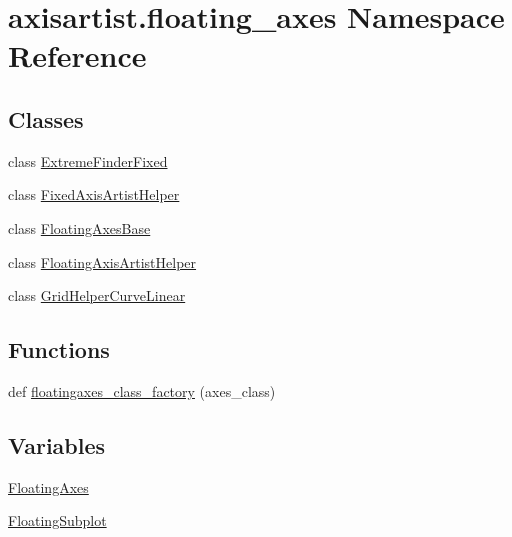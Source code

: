 \hypertarget{namespaceaxisartist_1_1floating__axes}{}\section{axisartist.\+floating\+\_\+axes Namespace Reference}
\label{namespaceaxisartist_1_1floating__axes}
\subsection*{Classes}
\begin{DoxyCompactItemize}
\item 
class \hyperlink{classaxisartist_1_1floating__axes_1_1ExtremeFinderFixed}{Extreme\+Finder\+Fixed}
\item 
class \hyperlink{classaxisartist_1_1floating__axes_1_1FixedAxisArtistHelper}{Fixed\+Axis\+Artist\+Helper}
\item 
class \hyperlink{classaxisartist_1_1floating__axes_1_1FloatingAxesBase}{Floating\+Axes\+Base}
\item 
class \hyperlink{classaxisartist_1_1floating__axes_1_1FloatingAxisArtistHelper}{Floating\+Axis\+Artist\+Helper}
\item 
class \hyperlink{classaxisartist_1_1floating__axes_1_1GridHelperCurveLinear}{Grid\+Helper\+Curve\+Linear}
\end{DoxyCompactItemize}
\subsection*{Functions}
\begin{DoxyCompactItemize}
\item 
def \hyperlink{namespaceaxisartist_1_1floating__axes_a8a8e74a121b233e5cfdec9364d070a54}{floatingaxes\+\_\+class\+\_\+factory} (axes\+\_\+class)
\end{DoxyCompactItemize}
\subsection*{Variables}
\begin{DoxyCompactItemize}
\item 
\hyperlink{namespaceaxisartist_1_1floating__axes_ad51c1c58a4ec5e1adfb5b561b9a80634}{Floating\+Axes}
\item 
\hyperlink{namespaceaxisartist_1_1floating__axes_a479b67952e21b1148cf9cb7ecf8be227}{Floating\+Subplot}
\end{DoxyCompactItemize}


